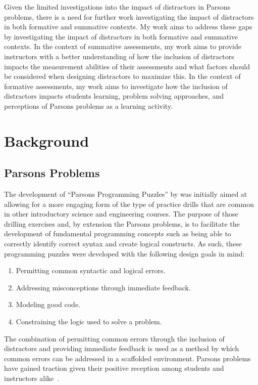 \documentclass[authorversion,nonacm]{acmart}
\begin{document}
Given the limited investigations into the impact of distractors in Parsons
problems, there is a need for further work investigating the impact of
distractors in both formative and summative contexts. My work aims to address
these gaps by investigating the impact of distractors in both formative and 
summative contexts. In the context of summative assessments, my work aims to 
provide instructors with a better understanding of how the inclusion of
distractors impacts the measurement abilities of their assessments and what
factors should be considered when designing distractors to maximize this. In the
context of formative assessments, my work aims to investigate how the inclusion
of distractors impacts students learning, problem solving approaches, and 
perceptions of Parsons problems as a learning activity.


\section{Background}

\subsection{Parsons Problems}

The development of ``Parsons Programming Puzzles'' by \citet{parsons2006parson}
was initially aimed at allowing for a more engaging form of the type of
practice drills that are common in other introductory science and engineering
courses. The purpose of those drilling exercises and, by extension the Parsons
problems, is to facilitate the development of fundamental programming concepts
such as being able to correctly identify correct syntax and create logical
constructs.  As such, these programming puzzles were developed with the
following design goals in mind:
\begin{enumerate}
    \item Permitting common syntactic and logical errors.
    \item Addressing misconceptions through immediate feedback.
    \item Modeling good code.
    \item Constraining the logic used to solve a problem.
\end{enumerate}
The combination of permitting common errors through the inclusion of
distractors and providing immediate feedback is used as a method by which
common errors can be addressed in a scaffolded environment.  Parsons problems
have gained traction given their positive reception among students and
instructors alike~\cite{ericson2015analysis, ericson2016identifying}.
\end{document}
